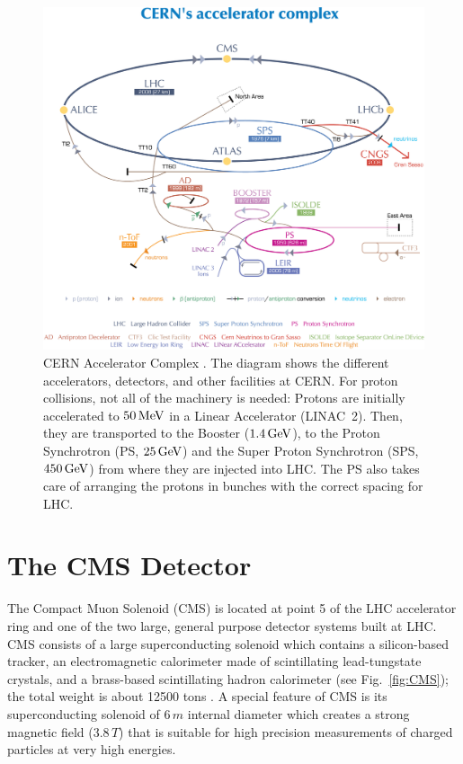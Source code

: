 \begin{figure}
	\includegraphics[width=.8\textwidth]{Detector/0812015}
	\centering
	\caption{CERN Accelerator Complex \cite{Christiane:1260465}. The diagram shows the different accelerators, detectors, and other facilities at CERN. For proton collisions, not all of the machinery is needed: Protons are initially accelerated to $50\,\text{Me\hspace{-.08em}V}$ in a Linear Accelerator (LINAC~2). Then, they are transported to the Booster ($1.4\,\text{Ge\hspace{-.08em}V}$), to the Proton Synchrotron (PS, $25\,\text{Ge\hspace{-.08em}V}$) and the Super Proton Synchrotron (SPS, $450\,\text{Ge\hspace{-.08em}V}$) from where they are injected into LHC. The PS also takes care of arranging the protons in bunches with the correct spacing for LHC.}
	\label{fig:LHC}
\end{figure}

\section{The CMS Detector}
The Compact Muon Solenoid (CMS) is located at point 5 of the LHC accelerator ring and one of the two large, general purpose detector systems built at LHC. CMS consists of a large superconducting solenoid which contains a silicon-based tracker, an electromagnetic calorimeter made of scintillating lead-tungstate crystals, and a brass-based scintillating hadron calorimeter (see Fig.~\ref{fig:CMS}); the total weight is about 12500 tons \cite{Chatrchyan:2008zzk}. A special feature of CMS is its superconducting solenoid of $6\,\unit{m}$ internal diameter which creates a strong magnetic field ($3.8\,\unit{T}$) that is suitable for high precision measurements of charged particles at very high energies.

